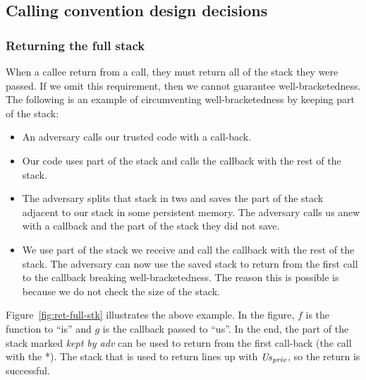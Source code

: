 \documentclass[a4paper]{article}
\begin{document}
\subsection{Calling convention design decisions}
\subsubsection{Returning the full stack}
When a callee return from a call, they must return all of the stack they were passed. If we omit this requirement, then we cannot guarantee well-bracketedness. The following is an example of circumventing well-bracketedness by keeping part of the stack:

\begin{itemize}
\item An adversary calls our trusted code with a call-back. 
\item Our code uses part of the stack and calls the callback with the rest of the stack.
\item The adversary splits that stack in two and saves the part of the stack adjacent to our stack in some persistent memory. The adversary calls us anew with a callback and the part of the stack they did not save. 
\item We use part of the stack we receive and call the callback with the rest of the stack. The adversary can now use the saved stack to return from the first call to the callback breaking well-bracketedness. The reason this is possible is because we do not check the size of the stack.
\end{itemize}
Figure~\ref{fig:ret-full-stk} illustrates the above example. In the figure, $f$ is the function to ``is'' and $g$ is the callback passed to ``us''. In the end, the part of the stack marked \emph{kept by adv} can be used to return from the first call-back (the call with the *). The stack that is used to return lines up with $\mathit{Us}_{\mathit{priv}}$, so the return is successful.
\end{document}
